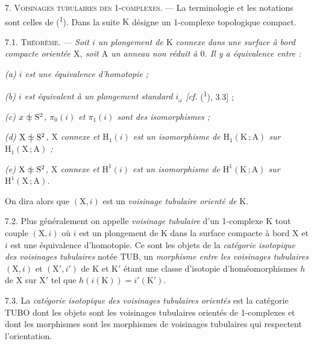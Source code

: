 7. \textsc{Voisinages tubulaires des 1-complexes.} --- La terminologie et les notations sont celles de (\textsuperscript{1}). Dans la suite \(\mathrm{K}\) désigne un 1-complexe topologique compact.

7.1. \textsc{Théorème.} --- \textit{Soit \(i\) un plongement de \(\mathrm{K}\) connexe dans une surface à bord compacte orientée \(\mathrm{X}\), soit \(\mathrm{A}\) un anneau non réduit à \(0\). Il y a équivalence entre :}

\textit{(a) \(i\) est une équivalence d'homotopie ;}

\textit{(b) \(i\) est équivalent à un plongement standard \(i_\omega\) [cf.} (\textsuperscript{1}), 3.3] ;

\textit{(c) \(x\mathrel{\ooalign{\hfil$\simeq$\hfil\cr\hfil$\vert$\hfil\cr}}\mathrm{S}^2\), \(\pi_0(i)\) \textup{et} \(\pi_1(i)\) sont des isomorphismes ;}

\textit{(d) \(\mathrm{X}\mathrel{\ooalign{\hfil$\simeq$\hfil\cr\hfil$\vert$\hfil\cr}}\mathrm{S}^2\), \(\mathrm{X}\) connexe et \(\mathrm{H}_1(i)\) est un isomorphisme de \(\mathrm{H}_1(\mathrm{K}\,;\mathrm{A})\) sur \(\mathrm{H}_1(\mathrm{X}\,;\mathrm{A})\) ;}

\textit{(e) \(\mathrm{X}\mathrel{\ooalign{\hfil$\simeq$\hfil\cr\hfil$\vert$\hfil\cr}}\mathrm{S}^2\), \(\mathrm{X}\) connexe et \(\mathrm{H}^1(i)\) est un isomorphisme de \(\mathrm{H}^1(\mathrm{K}\,;\mathrm{A})\) sur \(\mathrm{H}^1(\mathrm{X}\,;\mathrm{A})\).}

On dira alors que \((\mathrm{X},i)\) est un \textit{voisinage tubulaire orienté de} \(\mathrm{K}\).

7.2. Plus généralement on appelle \textit{voisinage tubulaire} d'un 1-complexe \(\mathrm{K}\) tout couple \((\mathrm{X},i)\) où \(i\) est un plongement de \(\mathrm{K}\) dans la surface compacte à bord \(\mathrm{X}\) et \(i\) est une équivalence d'homotopie. Ce sont les objets de la \textit{catégorie isotopique des voisinages tubulaires} notée TUB, un \textit{morphisme entre les voisinages tubulaires} \((\mathrm{X},i)\) et \((\mathrm{X}',i')\) de \(\mathrm{K}\) et \(\mathrm{K}'\) étant une classe d'isotopie d'homéomorphismes \(h\) de \(\mathrm{X}\) sur \(\mathrm{X}'\) tel que \(h(i(\mathrm{K}))=i'(\mathrm{K}')\).

7.3. La \textit{catégorie isotopique des voisinages tubulaires orientés} est la catégorie TUBO dont les objets sont les voisinages tubulaires orientés de 1-complexes et dont les morphismes sont les morphismes de voisinages tubulaires qui respectent l'orientation.

